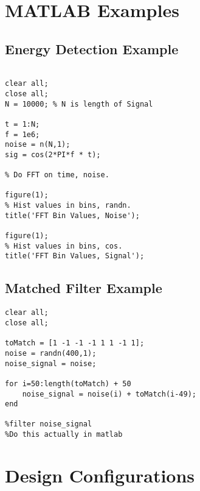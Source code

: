 \appendix
\chapter{MATLAB Examples}
\section{Energy Detection Example}
\label{app:energy_detection}
\begin{verbatim}

clear all;
close all;
N = 10000; % N is length of Signal 

t = 1:N;
f = 1e6;
noise = n(N,1);
sig = cos(2*PI*f * t);

% Do FFT on time, noise.

figure(1);
% Hist values in bins, randn.
title('FFT Bin Values, Noise');

figure(1);
% Hist values in bins, cos.
title('FFT Bin Values, Signal');
\end{verbatim}
\section{Matched Filter Example}
\label{app:matched_filter}
\begin{verbatim}
clear all;
close all;

toMatch = [1 -1 -1 -1 1 1 -1 1];
noise = randn(400,1);
noise_signal = noise;

for i=50:length(toMatch) + 50
    noise_signal = noise(i) + toMatch(i-49);
end

%filter noise_signal
%Do this actually in matlab
\end{verbatim}
\chapter{Design Configurations}
